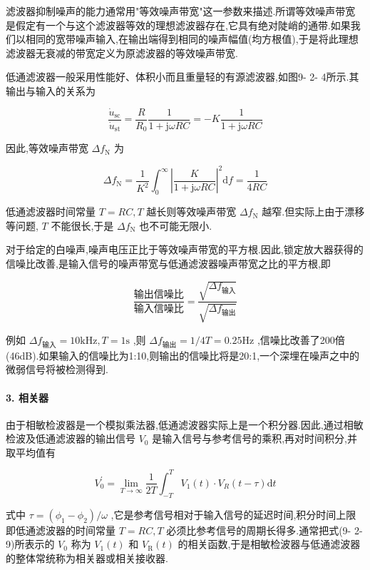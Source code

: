 \documentclass[12pt,a4paper]{article}
\begin{document}
滤波器抑制噪声的能力通常用"等效噪声带宽"这一参数来描述.所谓等效噪声带宽是假定有一个与这个滤波器等效的理想滤波器存在,它具有绝对陡峭的通带.如果我们以相同的宽带噪声输入,在输出端得到相同的噪声幅值(均方根值),于是将此理想滤波器无衰减的带宽定义为原滤波器的等效噪声带宽.

低通滤波器一般采用性能好、体积小而且重量轻的有源滤波器,如图9- 2- 4所示.其输出与输入的关系为

\[
\frac{\dot{u}_{\mathrm{sc}}}{\dot{u}_{\mathrm{st}}} = \frac{R}{R_{0}}\frac{1}{1 + \mathrm{j}\omega R C} = -K\frac{1}{1 + \mathrm{j}\omega R C}
\]

因此,等效噪声带宽 \(\Delta f_{\mathrm{N}}\) 为

\[
\Delta f_{\mathrm{N}} = \frac{1}{K^{2}}\int_{0}^{\infty}\left|\frac{K}{1 + \mathrm{j}\omega R C}\right|^{2}\mathrm{d}f = \frac{1}{4R C}
\]

低通滤波器时间常量 \(T = R C,T\) 越长则等效噪声带宽 \(\Delta f_{\mathrm{N}}\) 越窄.但实际上由于漂移等问题, \(T\) 不能很长,于是 \(\Delta f_{\mathrm{N}}\) 也不可能无限小.

对于给定的白噪声,噪声电压正比于等效噪声带宽的平方根.因此,锁定放大器获得的信噪比改善,是输入信号的噪声带宽与低通滤波器噪声带宽之比的平方根,即

\[
\frac{\mathrm{输出信噪比}}{\mathrm{输入信噪比}} = \frac{\sqrt{\Delta f_{\mathrm{输入}}}}{\sqrt{\Delta f_{\mathrm{输出}}}}
\]

例如 \(\Delta f_{\mathrm{输入}} = 10 \mathrm{kHz}, T = 1 \mathrm{s}\) ,则 \(\Delta f_{\mathrm{输出}} = 1 / 4 T = 0.25 \mathrm{Hz}\) ,信噪比改善了200倍(46dB).如果输入的信噪比为1:10,则输出的信噪比将是20:1,一个深埋在噪声之中的微弱信号将被检测得到.

\paragraph{3. 相关器}

由于相敏检波器是一个模拟乘法器,低通滤波器实际上是一个积分器.因此,通过相敏检波及低通滤波器的输出信号 \(V_{0}\) 是输入信号与参考信号的乘积,再对时间积分,并取平均值有

\[
V_{0}^{\prime} = \lim_{T\to \infty}\frac{1}{2T}\int_{-T}^{T}V_{1}(t)\cdot V_{R}(t - \tau)\mathrm{d}t \tag{9-2-9}
\]

式中 \(\tau = (\phi_{1} - \phi_{2}) / \omega\) ,它是参考信号相对于输入信号的延迟时间,积分时间上限即低通滤波器的时间常量 \(T = R C,T\) 必须比参考信号的周期长得多.通常把式(9- 2- 9)所表示的 \(V_{0}\) 称为 \(V_{1}(t)\) 和 \(V_{\mathrm{R}}(t)\) 的相关函数,于是相敏检波器与低通滤波器的整体常统称为相关器或相关接收器.
\end{document}
